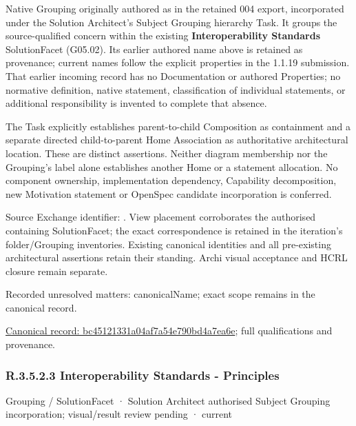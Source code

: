 Native Grouping originally authored as \texttt{} in the retained 004 export,
incorporated under the Solution Architect's Subject Grouping hierarchy Task.
It groups the source-qualified \texttt{} concern within
the existing \textbf{Interoperability Standards} SolutionFacet (G05.02). Its earlier authored name above is retained as provenance; current names
follow the explicit properties in the 1.1.19 submission.
That earlier incoming record has no Documentation or authored Properties; no normative
definition, native statement, classification of individual statements, or
additional responsibility is invented to complete that absence.



The Task explicitly establishes parent-to-child Composition as containment and
a separate directed child-to-parent Home Association as authoritative architectural
location. These are distinct assertions. Neither diagram membership nor the
Grouping's label alone establishes another Home or a statement allocation.
No component ownership, implementation dependency, Capability decomposition,
new Motivation statement or OpenSpec candidate incorporation is conferred.



Source Exchange identifier: \texttt{}. View placement corroborates
the authorised containing SolutionFacet; the exact correspondence is retained in the
iteration's folder/Grouping inventories. Existing canonical identities and all
pre-existing architectural assertions retain their standing. Archi visual
acceptance and HCRL closure remain separate.


{\small Recorded unresolved matters: canonicalName; exact scope remains in the canonical record.}\par
{\footnotesize \href{../../../../../../../continuum/grouping/bc45121331a04af7a54e790bd4a7ea6e.md}{Canonical record: bc45121331a04af7a54e790bd4a7ea6e}; full qualifications and provenance.}\par
\subsubsection*{R.3.5.2.3 Interoperability Standards - Principles}
\label{navigation:R.3.5.2.3}

\label{element:db0cac8c53b7404b8f2c17a542db7604}
{\small Grouping / SolutionFacet · Solution Architect authorised Subject Grouping incorporation; visual/result review pending · current}\par

